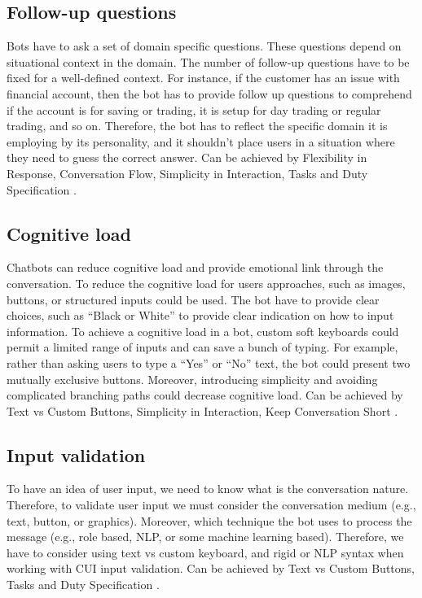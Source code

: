 \subsection{Follow-up questions}
Bots have to ask a set of domain specific questions. These questions depend on situational context in the domain. The number of follow-up questions have to be fixed for a well-defined context. For instance, if the customer has an issue with financial account, then the bot has to provide follow up questions to comprehend if the account is for saving or trading, it is setup for day trading or regular trading, and so on. Therefore, the bot has to reflect the specific domain it is employing by its personality, and it shouldn’t place users in a situation where they need to guess the correct answer. Can be achieved by Flexibility in Response, Conversation Flow, Simplicity in Interaction, Tasks and Duty Specification \cite{fadhil2018}.

\subsection{Cognitive load}
Chatbots can reduce cognitive load and provide emotional link through the conversation. To reduce the cognitive load for users approaches, such as images, buttons, or structured inputs could be used. The bot have to provide clear choices, such as “Black or White” to provide clear indication on how to input information. To achieve a cognitive load in a bot, custom soft keyboards could permit a limited range of inputs and can save a bunch of typing. For example, rather than asking users to type a “Yes” or “No” text, the bot could present two mutually exclusive buttons. Moreover, introducing simplicity and avoiding complicated branching paths could decrease cognitive load. Can be achieved by Text vs Custom Buttons, Simplicity in Interaction, Keep Conversation Short \cite{fadhil2018}.


\subsection{Input validation}
To have an idea of user input, we need to know what is the conversation nature. Therefore, to validate user input we must consider the conversation medium (e.g., text, button, or graphics). Moreover, which technique the bot uses to process the message (e.g., role based, NLP, or some machine learning based). Therefore, we have to consider using text vs custom keyboard, and rigid or NLP syntax when working with CUI input validation. Can be achieved by Text vs Custom Buttons, Tasks and Duty Specification \cite{fadhil2018}.

